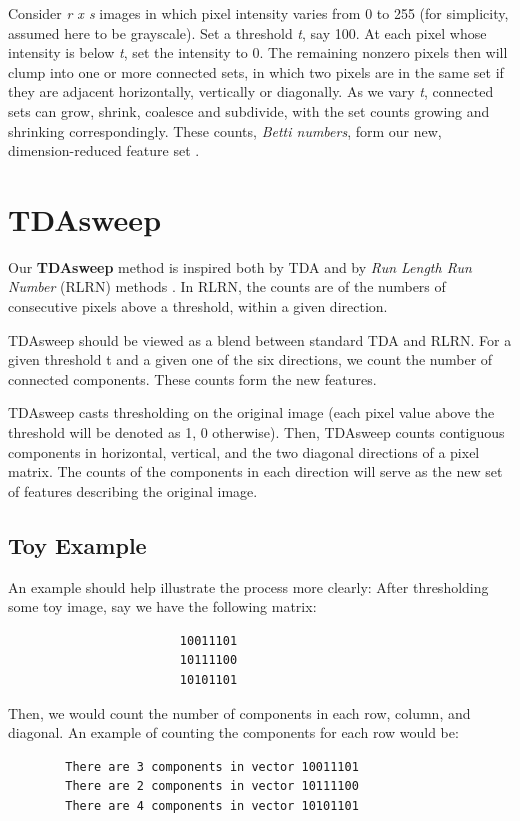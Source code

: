 \documentclass{article}
\begin{document}
Consider \emph{r x s} images in which pixel intensity varies from 0 to 255 (for simplicity, assumed here to be grayscale). Set a threshold \emph{t}, say 100. At each pixel whose intensity is below \emph{t}, set the intensity to 0. The remaining nonzero pixels then will clump into one or more connected sets, in which two pixels are in the same set if they are adjacent horizontally, vertically or diagonally. As we vary \emph{t}, connected sets can grow, shrink, coalesce and subdivide, with the set counts growing and shrinking correspondingly. These counts, \emph{Betti numbers}, form our new, dimension-reduced feature set \cite{garside_henderson_makarenko_masoller_2019}.


\section{TDAsweep}
Our \textbf{TDAsweep} method is inspired both by TDA and by \emph{Run Length Run Number} (RLRN) methods \cite{inproceedings} \cite{mir_hanmandlu_tandon_1995}. In RLRN, the counts are of the numbers of consecutive pixels above a threshold, within a given direction.

TDAsweep should be viewed as a blend between standard TDA and RLRN. For a given threshold t and a given one of the six directions, we count the number of connected components. These counts form the new features.

TDAsweep casts thresholding on the original image (each pixel value above the threshold will be denoted as 1, 0 otherwise). Then, TDAsweep counts contiguous components in horizontal, vertical, and the two diagonal directions of a pixel matrix. The counts of the components in each direction will serve as the new set of features describing the original image.

\subsection{Toy Example}
An example should help illustrate the process more clearly: After thresholding some toy image, say we have the following matrix:
\begin{verbatim}
                        10011101
                        10111100
                        10101101
\end{verbatim}

Then, we would count the number of components in each row, column, and diagonal. An example of counting the components for each row would be:
\begin{verbatim}
        There are 3 components in vector 10011101
        There are 2 components in vector 10111100
        There are 4 components in vector 10101101
\end{verbatim}
\end{document}
